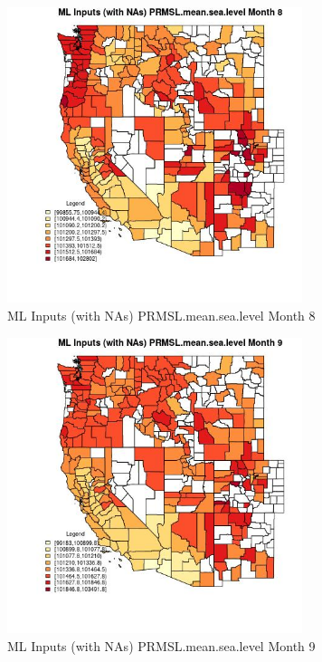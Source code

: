 \begin{figure} 
\centering  
\includegraphics[width=0.77\textwidth]{Code_Outputs/Report_ML_input_PM25_Step4_part_f_de_duplicated_aves_prioritize_24hr_obswNAs_CountyPRMSLmeansealevelmedianMonth8.jpg} 
\caption{\label{fig:Report_ML_input_PM25_Step4_part_f_de_duplicated_aves_prioritize_24hr_obswNAsCountyPRMSLmeansealevelmedianMonth8}ML Inputs (with NAs) PRMSL.mean.sea.level Month 8} 
\end{figure} 
 

\clearpage 

\begin{figure} 
\centering  
\includegraphics[width=0.77\textwidth]{Code_Outputs/Report_ML_input_PM25_Step4_part_f_de_duplicated_aves_prioritize_24hr_obswNAs_CountyPRMSLmeansealevelmedianMonth9.jpg} 
\caption{\label{fig:Report_ML_input_PM25_Step4_part_f_de_duplicated_aves_prioritize_24hr_obswNAsCountyPRMSLmeansealevelmedianMonth9}ML Inputs (with NAs) PRMSL.mean.sea.level Month 9} 
\end{figure} 
 

